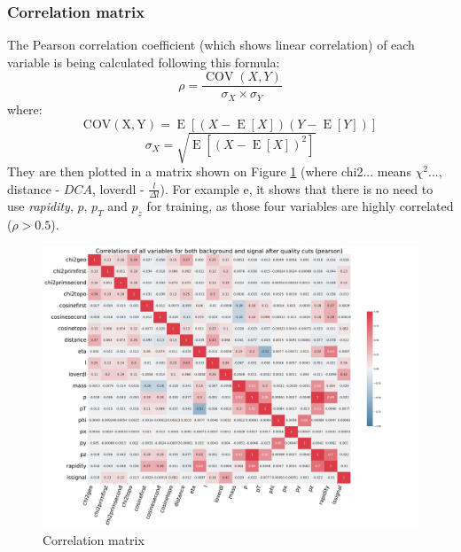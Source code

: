 \subsubsection{Correlation matrix}
The Pearson correlation coefficient (which shows linear correlation) of each variable is being calculated following this formula:
\begin{equation}
    \rho = \frac{\operatorname{COV}(X, Y)}{\sigma_X \times \sigma_Y}
    \label{pearson}
\end{equation}
where:
\begin{equation}
    \operatorname{COV(X, Y)} = \operatorname{E}\left[\left(X - \operatorname{E}\left[X\right]\right) \left(Y - \operatorname{E}\left[Y\right]\right)\right]
\end{equation}
\begin{equation}
    \sigma_X = \sqrt{\operatorname{E}\left[\left(X - \operatorname{E}\left[X\right]\right)^2\right]}
    \label{stddev}
\end{equation}
They are then plotted in a matrix shown on Figure \ref{correlation matrix} (where chi2... means $\chi^2$..., distance - $DCA$, loverdl - $\frac{l}{\Delta l}$). For example  e, it shows that there is no need to use  \emph{rapidity}, $p$, $p_T$ and $p_z$ for training, as those four variables are highly correlated ($\rho > 0.5$). 
\begin{figure}[h!]
    \centering
    \includegraphics[width=1.1\textwidth]{img/Correlations_of_all_variables_for_both_background_and_signal_after_quality_cuts_(pearson).pdf}
    \caption{Correlation matrix}
    \label{correlation matrix}
\end{figure}
\clearpage
